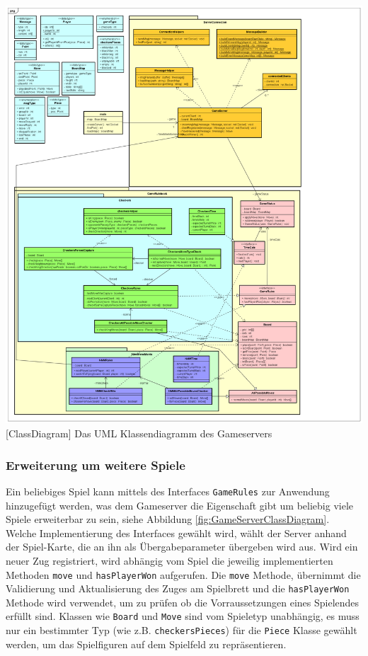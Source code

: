 \documentclass[12pt,a4paper,bibliography=totocnumbered,listof=totocnumbered]{article}
\begin{document}
\vspace{1em}
\begin{minipage}{\linewidth}
	\centering
	\includegraphics[width=1.0\linewidth]{pics/GameServerClassDiagram.png}
	[ClassDiagram]{ Das UML Klassendiagramm des Gameservers }
	\label{fig:GameServerClassDiagram}
\end{minipage}

\subsubsection{Erweiterung um weitere Spiele}
Ein beliebiges Spiel kann mittels des Interfaces \texttt{GameRules} zur Anwendung hinzugefügt werden, was dem Gameserver die Eigenschaft gibt um 
beliebig viele Spiele erweiterbar zu sein, siehe Abbildung \ref{fig:GameServerClassDiagram}. Welche Implementierung des Interfaces gewählt wird, wählt der Server anhand der Spiel-Karte, die an ihn
als Übergabeparameter übergeben wird aus. Wird ein neuer Zug registriert, wird abhängig vom Spiel die jeweilig implementierten Methoden 
\texttt{move} und \texttt{hasPlayerWon} aufgerufen.
Die \texttt{move} Methode, übernimmt die Validierung und Aktualisierung des Zuges am Spielbrett und
die \texttt{hasPlayerWon} Methode wird verwendet, um zu prüfen ob die Vorraussetzungen eines Spielendes erfüllt sind.
Klassen wie \texttt{Board} und \texttt{Move} sind vom Spieletyp unabhängig, es muss nur ein bestimmter Typ (wie z.B. \texttt{checkersPieces}) für die \texttt{Piece} 
Klasse gewählt werden, um das Spielfiguren auf dem Spielfeld zu repräsentieren.  
\end{document}
